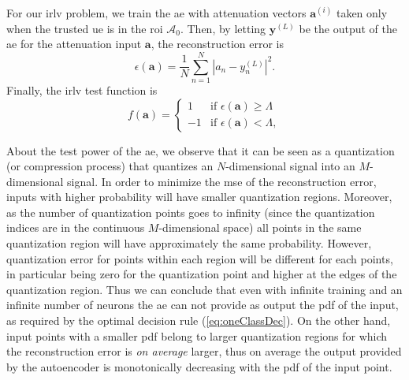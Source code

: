 \documentclass[draftcls,onecolumn,12pt]{IEEEtran}
\begin{document}
For our \ac{irlv} problem, we train the \ac{ae} with attenuation vectors $\bm{a}^{(i)}$ taken only when the trusted \ac{ue} is in the \ac{roi} $\mathcal A_0$. Then, by letting $\bm{y}^{(L)}$ be the output of the \ac{ae} for the attenuation input $\bm{a}$, the reconstruction error is 
\begin{equation}\label{eq: rec err}
    \epsilon(\bm{a} ) = \frac{1}{N}\sum_{n=1}^{N}|a_n-y^{(L)}_n|^2.
\end{equation}
Finally, the \ac{irlv} test function  is  
\begin{equation}
f(\bm{a}) =
\begin{cases}
1 &\text{if } \epsilon(\bm{a} ) \geq \Lambda \\
-1 & \text{if } \epsilon(\bm{a} ) < \Lambda,
\end{cases}
\end{equation}

About the test power of the \ac{ae}, we observe that it can be seen as a quantization (or compression process) that quantizes an $N$-dimensional signal into an $M$-dimensional signal. In order to minimize the \ac{mse} of the reconstruction error, inputs with higher probability will have smaller quantization regions. Moreover, as the number of quantization points goes to infinity (since the quantization indices are in the continuous $M$-dimensional space) all points in the same quantization region will have approximately the same probability. However, quantization error for points within each region will be different for each points, in particular being zero for the quantization point and higher at the edges of the quantization region. Thus we can conclude that even with infinite training and an infinite number of neurons the \ac{ae} can not provide as output the \ac{pdf} of the input, as required by the optimal decision rule (\ref{eq:oneClassDec}). On the other hand, input points with a smaller \ac{pdf} belong to larger quantization regions for which the reconstruction error is {\em on average} larger, thus on average the output provided by the autoencoder is monotonically decreasing with the \ac{pdf} of the input point. 
\end{document}

